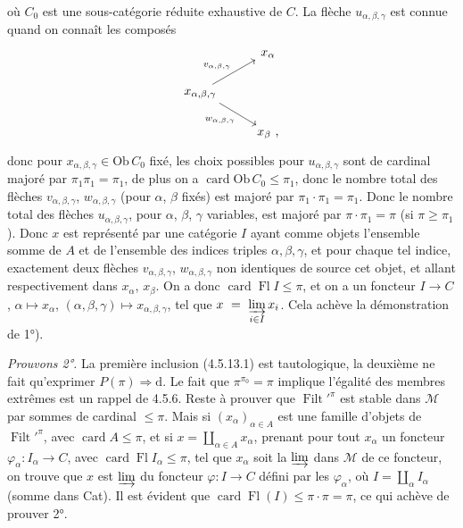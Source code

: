 \documentclass[11pt]{article}
\newcommand{\printedpage}[1]{\if\relax\detokenize{#1}\relax\else\marginpar{\footnotesize p.~#1}\fi}
\newcommand{\msp}[1]{\marginpar{\footnotesize [#1]}}
\newcommand{\Ob}{\mathrm{Ob}\,}
\newcommand{\card}{\operatorname{card}}
\newcommand{\Fl}{\operatorname{Fl}}
\newcommand{\Filt}{\operatorname{Filt}}
\begin{document}
\printedpage{41}
où $C_0$ est une sous-catégorie réduite exhaustive de $C$. La flèche $u_{\alpha,\beta,\gamma}$ est connue quand on connaît les composés
\msp{page 131}
\[
\begin{tikzcd}
& x_{\alpha} \\
x_{\alpha,\beta,\gamma} \arrow[ur, "v_{\alpha,\beta,\gamma}"] \arrow[dr, "w_{\alpha,\beta,\gamma}"'] & \\
& x_{\beta} \text{ ,}
\end{tikzcd}
\]
donc pour $x_{\alpha,\beta,\gamma} \in \Ob C_0$ fixé, les choix possibles pour $u_{\alpha,\beta,\gamma}$ sont de cardinal majoré par $\pi_1\pi_1 = \pi_1$, de plus on a $\card \Ob C_0 \leqslant \pi_1$, donc le nombre total des flèches $v_{\alpha,\beta,\gamma}$, $w_{\alpha,\beta,\gamma}$ (pour $\alpha$, $\beta$ fixés) est majoré par $\pi_1 \cdot \pi_1 = \pi_1$. Donc le nombre total des flèches $u_{\alpha,\beta,\gamma}$, pour $\alpha$, $\beta$, $\gamma$ variables, est majoré par $\pi \cdot \pi_1 = \pi$ (si $\pi \geqslant \pi_1$). Donc $x$ est représenté par une catégorie $I$ ayant comme objets l'ensemble somme de $A$ et de l'ensemble des indices triples $\alpha,\beta,\gamma$, et pour chaque tel indice, exactement deux flèches $v_{\alpha,\beta,\gamma}$, $w_{\alpha,\beta,\gamma}$ non identiques de source cet objet, et allant respectivement dans $x_{\alpha}$, $x_{\beta}$. On a donc $\card \Fl I \leqslant \pi$, et on a un foncteur $I \longrightarrow C$, $\alpha \longmapsto x_{\alpha}$, $(\alpha,\beta,\gamma) \longmapsto x_{\alpha,\beta,\gamma}$, tel que $x \ = \ \varinjlim\limits_{i\in I} x_i$. Cela achève la démonstration de 1°).

\msp{page 132}
\textit{Prouvons 2°.} La première inclusion (4.5.13.1) est tautologique, la deuxième ne fait qu'exprimer $P(\pi) \Longrightarrow \mathrm{d}$. Le fait que $\pi^{\pi_0} = \pi$ implique l'égalité des membres extrêmes est un rappel de 4.5.6. Reste à prouver que $\Filt'^{\pi}$ est stable dans $\mathcal{M}$ par sommes de cardinal $\leqslant \pi$. Mais si $(x_{\alpha})_{\alpha\in A}$ est une famille d'objets de $\Filt'^{\pi}$, avec $\card A \leqslant \pi$, et si $x = \coprod_{\alpha\in A} x_{\alpha}$, prenant pour tout $x_{\alpha}$ un foncteur $\varphi_{\alpha} : I_{\alpha} \longrightarrow C$, avec $\card \Fl I_{\alpha} \leqslant \pi$, tel que $x_{\alpha}$ soit la $\varinjlim$ dans $\mathcal{M}$ de ce foncteur, on trouve que $x$ est $\varinjlim$ du foncteur $\varphi : I \longrightarrow C$ défini par les $\varphi_{\alpha}$, où $I = \coprod_{\alpha} I_{\alpha}$ (somme dans Cat). Il est évident que $\card \Fl(I) \leqslant \pi\cdot\pi = \pi$, ce qui achève de prouver 2°.
\end{document}
